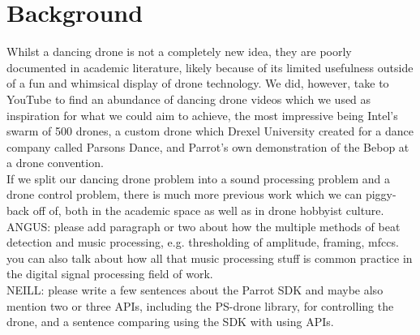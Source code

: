 \section{Background}

Whilst a dancing drone is not a completely new idea, they are poorly documented in academic literature, likely because of its limited usefulness outside of a fun and whimsical display of drone technology. We did, however, take to YouTube to find an abundance of dancing drone videos which we used as inspiration for what we could aim to achieve, the most impressive being Intel's swarm of 500 drones, a custom drone which Drexel University created for a dance company called Parsons Dance, and Parrot's own demonstration of the Bebop at a drone convention.\\


If we split our dancing drone problem into a sound processing problem and a drone control problem, there is much more previous work which we can piggy-back off of, both in the academic space as well as in drone hobbyist culture.\\

ANGUS: please add paragraph or two about how the multiple methods of beat detection and music processing, e.g. thresholding of amplitude, framing, mfccs. you can also talk about how all that music processing stuff is common practice in the digital signal processing field of work.\\

NEILL: please write a few sentences about the Parrot SDK and maybe also mention two or three APIs, including the PS-drone library, for controlling the drone, and a sentence comparing using the SDK with using APIs.